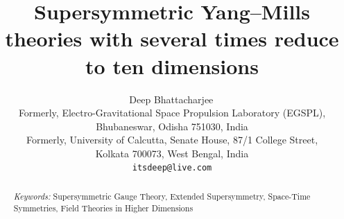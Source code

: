 \documentclass[a4paper,11pt]{article}
\title{Supersymmetric Yang--Mills theories with several times reduce to ten dimensions}
\author{Deep Bhattacharjee\,\orcidlink{0000-0003-0466-750X}\\[4pt]
\small Formerly, Electro-Gravitational Space Propulsion Laboratory (EGSPL),\\
\small Bhubaneswar, Odisha 751030, India\\[3pt]
\small Formerly, University of Calcutta, Senate House, 87/1 College Street,\\
\small Kolkata 700073, West Bengal, India\\[3pt]
\small \texttt{itsdeep@live.com}}
\date{}
\numberwithin{equation}{section}
\begin{document}
\maketitle

\begin{abstract}


\medskip\noindent\textit{Keywords:} Supersymmetric Gauge Theory, Extended Supersymmetry, Space-Time Symmetries, Field Theories in Higher Dimensions
\end{abstract}

\tableofcontents




\end{document}
